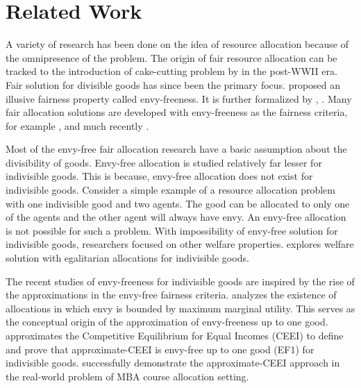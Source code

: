 
\section{Related Work}
\label{section_related}

A variety of research has been done on the idea of resource allocation because of the omnipresence of the problem. The origin of fair resource allocation can be tracked to the introduction of cake-cutting problem by \citet{steihaus1948problem} in the post-WWII era. Fair solution for divisible goods has since been the primary focus. \citet{stern1958puzzle} proposed an illusive fairness property called envy-freeness. It is further formalized by \citet{foley1967resource}, \citet{varian1973equity}. Many fair allocation solutions are developed with envy-freeness as the fairness criteria, for example \citet{stromquist2008envy}, \citet{brams1996fair} and much recently \citet{aziz2016discrete}.

Most of the envy-free fair allocation research have a basic assumption about the divisibility of goods. Envy-free allocation is studied relatively far lesser for indivisible goods. This is because, envy-free allocation does not exist for indivisible goods. Consider a simple example of a resource allocation problem with one indivisible good and two agents. The good can be allocated to only one of the agents and the other agent will always have envy. An envy-free allocation is not possible for such a problem. With impossibility of envy-free solution for indivisible goods, researchers focused on other welfare properties. \citet{matt2006egalitarian} explores welfare solution with egalitarian allocations for indivisible goods.

The recent studies of envy-freeness for indivisible goods are inspired by the rise of the approximations in the envy-free fairness criteria. \citet{lipton2004approximately} analyzes the existence of allocations in which envy is bounded by maximum marginal utility. This serves as the conceptual origin of the approximation of envy-freeness up to one good. \citet{budish2011combinatorial} approximates the Competitive Equilibrium for Equal Incomes (CEEI) \cite{varian1973equity} to define and prove that approximate-CEEI is envy-free up to one good (EF1) for indivisible goods. \citet{budish2011combinatorial} successfully demonstrate the approximate-CEEI approach in the real-world problem of MBA course allocation setting. 

